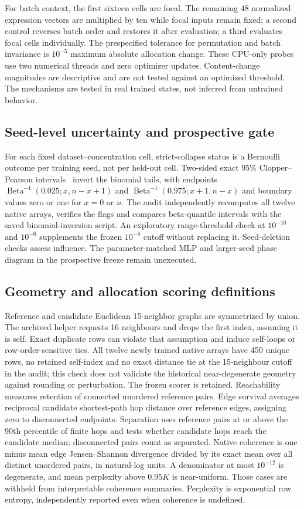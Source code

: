 For batch context, the first sixteen cells are focal. The remaining 48 normalized expression vectors are multiplied by ten while focal inputs remain fixed; a second control reverses batch order and restores it after evaluation; a third evaluates focal cells individually. The prespecified tolerance for permutation and batch invariance is $10^{-5}$ maximum absolute allocation change. These CPU-only probes use two numerical threads and zero optimizer updates. Content-change magnitudes are descriptive and are not tested against an optimized threshold. The mechanisms are tested in real trained states, not inferred from untrained behavior.

\subsection{Seed-level uncertainty and prospective gate}
For each fixed dataset--concentration cell, strict-collapse status is a Bernoulli outcome per training seed, not per held-out cell. Two-sided exact 95\% Clopper--Pearson intervals~\cite{clopper1934limits} invert the binomial tails, with endpoints $\operatorname{Beta}^{-1}(0.025;x,n-x+1)$ and $\operatorname{Beta}^{-1}(0.975;x+1,n-x)$ and boundary values zero or one for $x=0$ or $n$. The audit independently recomputes all twelve native arrays, verifies the flags and compares beta-quantile intervals with the saved binomial-inversion script. An exploratory range-threshold check at $10^{-10}$ and $10^{-6}$ supplements the frozen $10^{-8}$ cutoff without replacing it. Seed-deletion checks assess influence. The parameter-matched MLP and larger-seed phase diagram in the prospective freeze remain unexecuted.

\subsection{Geometry and allocation scoring definitions}
Reference and candidate Euclidean 15-neighbor graphs are symmetrized by union. The archived helper requests 16 neighbours and drops the first index, assuming it is self. Exact duplicate rows can violate that assumption and induce self-loops or row-order-sensitive ties. All twelve newly trained native arrays have 450 unique rows, no retained self-index and no exact distance tie at the 15-neighbour cutoff in the audit; this check does not validate the historical near-degenerate geometry against rounding or perturbation. The frozen scorer is retained. Reachability measures retention of connected unordered reference pairs. Edge survival averages reciprocal candidate shortest-path hop distance over reference edges, assigning zero to disconnected endpoints. Separation uses reference pairs at or above the 90th percentile of finite hops and tests whether candidate hops reach the candidate median; disconnected pairs count as separated. Native coherence is one minus mean edge Jensen--Shannon divergence divided by its exact mean over all distinct unordered pairs, in natural-log units. A denominator at most $10^{-12}$ is degenerate, and mean perplexity above $0.95K$ is near-uniform. Those cases are withheld from interpretable coherence summaries. Perplexity is exponential row entropy, independently reported even when coherence is undefined.
